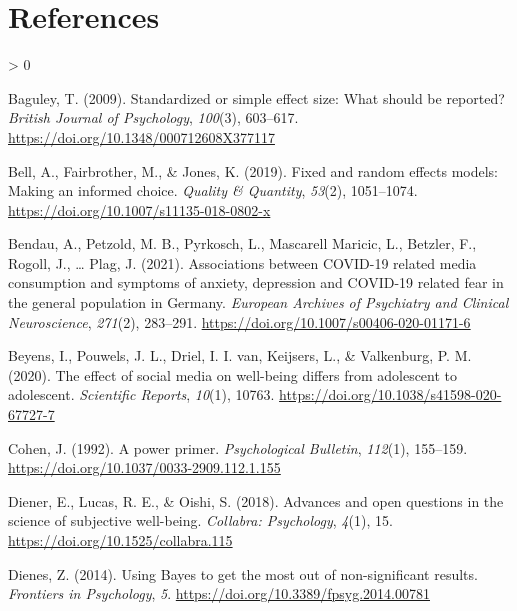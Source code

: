 \documentclass[
  english,
  man,floatsintext]{apa6}
\newlength{\cslhangindent}
\newenvironment{CSLReferences}[2] %
 {%
  \setlength{\parindent}{0pt}
  \ifodd #1 \everypar{\setlength{\hangindent}{\cslhangindent}}\ignorespaces\fi
  \ifnum #2 > 0
  \setlength{\parskip}{#2\baselineskip}
  \fi
 }%
 {}
\begin{document}
\newpage

\hypertarget{references}{%
\section{References}\label{references}}

\hypertarget{refs}{}
\begin{CSLReferences}{1}{0}
\leavevmode\hypertarget{ref-baguleyStandardizedSimpleEffect2009}{}%
Baguley, T. (2009). Standardized or simple effect size: {What} should be reported? \emph{British Journal of Psychology}, \emph{100}(3), 603--617. \url{https://doi.org/10.1348/000712608X377117}

\leavevmode\hypertarget{ref-bellFixedRandomEffects2019}{}%
Bell, A., Fairbrother, M., \& Jones, K. (2019). Fixed and random effects models: Making an informed choice. \emph{Quality \& Quantity}, \emph{53}(2), 1051--1074. \url{https://doi.org/10.1007/s11135-018-0802-x}

\leavevmode\hypertarget{ref-bendauAssociationsCOVID19Related2021}{}%
Bendau, A., Petzold, M. B., Pyrkosch, L., Mascarell Maricic, L., Betzler, F., Rogoll, J., \ldots{} Plag, J. (2021). Associations between {COVID}-19 related media consumption and symptoms of anxiety, depression and {COVID}-19 related fear in the general population in {Germany}. \emph{European Archives of Psychiatry and Clinical Neuroscience}, \emph{271}(2), 283--291. \url{https://doi.org/10.1007/s00406-020-01171-6}

\leavevmode\hypertarget{ref-beyensEffectSocialMedia2020}{}%
Beyens, I., Pouwels, J. L., Driel, I. I. van, Keijsers, L., \& Valkenburg, P. M. (2020). The effect of social media on well-being differs from adolescent to adolescent. \emph{Scientific Reports}, \emph{10}(1), 10763. \url{https://doi.org/10.1038/s41598-020-67727-7}

\leavevmode\hypertarget{ref-cohenPowerPrimer1992}{}%
Cohen, J. (1992). A power primer. \emph{Psychological Bulletin}, \emph{112}(1), 155--159. \url{https://doi.org/10.1037/0033-2909.112.1.155}

\leavevmode\hypertarget{ref-dienerAdvancesOpenQuestions2018}{}%
Diener, E., Lucas, R. E., \& Oishi, S. (2018). Advances and open questions in the science of subjective well-being. \emph{Collabra: Psychology}, \emph{4}(1), 15. \url{https://doi.org/10.1525/collabra.115}

\leavevmode\hypertarget{ref-dienesUsingBayesGet2014}{}%
Dienes, Z. (2014). Using {Bayes} to get the most out of non-significant results. \emph{Frontiers in Psychology}, \emph{5}. \url{https://doi.org/10.3389/fpsyg.2014.00781}


\end{CSLReferences}
\end{document}
